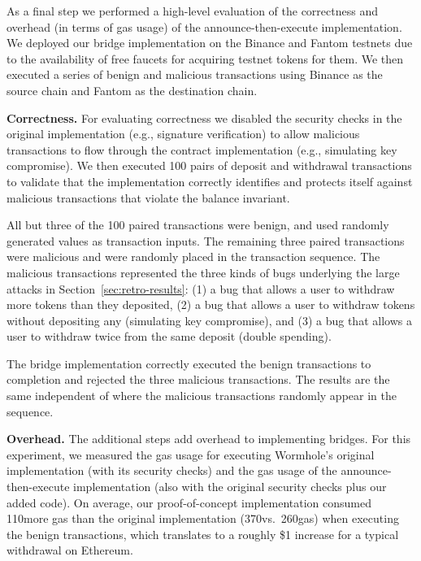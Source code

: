 As a final step we performed a high-level evaluation of the
correctness and overhead (in terms of gas usage) of the
announce-then-execute implementation.  We deployed our bridge
implementation on the Binance and Fantom testnets due to the
availability of free faucets for acquiring testnet tokens for them.
We then executed a series of benign and malicious transactions using
Binance as the source chain and Fantom as the destination chain.



\textbf{Correctness.}  For evaluating correctness we disabled the
security checks in the original implementation (e.g., signature
verification) to allow malicious transactions to flow through the
contract implementation (e.g., simulating key compromise).  We then
executed 100 pairs of deposit and withdrawal transactions to validate
that the implementation correctly identifies and protects itself
against malicious transactions that violate the balance invariant.

All but three of the 100 paired transactions were benign, and used
randomly generated values as transaction inputs.
%
The remaining three paired transactions were malicious and were
randomly placed in the transaction sequence.  The malicious
transactions represented the three kinds of bugs underlying the
large attacks in Section~\ref{sec:retro-results}: (1) a bug that
allows a user to withdraw more tokens than they deposited, (2) a bug
that allows a user to withdraw tokens without depositing any
(simulating key compromise), and (3) a bug that allows a user to
withdraw twice from the same deposit (double spending).

The bridge implementation correctly executed the benign transactions
to completion and rejected the three malicious transactions.  The
results are the same independent of where the malicious transactions
randomly appear in the sequence.

\textbf{Overhead.}  The additional steps add overhead to implementing
bridges.  For this experiment, we measured the gas usage for executing
Wormhole's original implementation (with its security checks) and the
gas usage of the announce-then-execute implementation (also with the
original security checks plus our added code).  On average, our
proof-of-concept implementation consumed 110\thou more gas than the
original implementation (370\thou vs.\ 260\thou gas) when
executing the benign transactions, which translates to a
roughly \$1 increase for a typical withdrawal on Ethereum.

